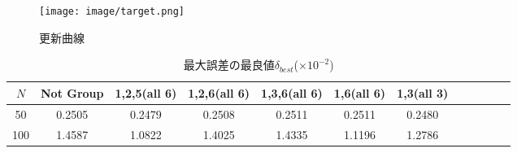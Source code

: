 \documentclass[dvipdfmx,9pt]{ieej}
\begin{document}
\vspace{-1zh}
\begin{figure}[h]
    \centering
     \texttt{[image: image/target.png]}
\caption{更新曲線}
\label{fig:target.png}
\end{figure}

\begin{table*}[t]
\caption{最大誤差の最良値$ \delta_{best} $(×$10^{-2}$)}
\vspace{0.5zh}
\label{tbl:data type1}
\begin{center}
	\begin{tabular}{c|c|c|c|c|c|c|c|c|c|c|c|}
		\hline
		$N$ &Not Group & 1,2,5(all 6) & 1,2,6(all 6)& 1,3,6(all 6) & 1,6(all 6) & 1,3(all 3)  \\
		\hline 
		50 & 0.2505  & 0.2479 & 0.2508 & 0.2511 & 0.2511  & 0.2480 \\ \hline
		100 & 1.4587  & 1.0822  & 1.4025 & 1.4335 & 1.1196 & 1.2786  \\ \hline
	\end{tabular}
\end{center}
\end{table*}
\end{document}
